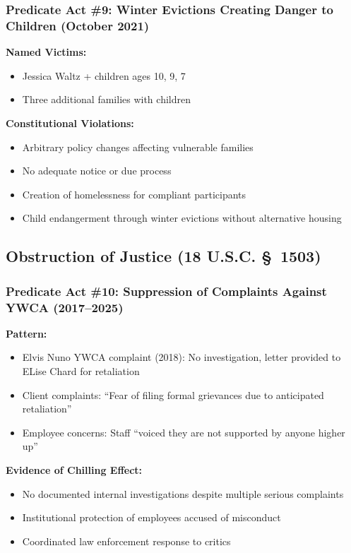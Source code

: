 \documentclass[11pt,letterpaper]{article}
\begin{document}
\subsubsection{Predicate Act \#9: Winter Evictions Creating Danger to Children (October 2021)}

\textbf{Named Victims:}
\begin{itemize}[leftmargin=*]
\item Jessica Waltz + children ages 10, 9, 7
\item Three additional families with children
\end{itemize}

\textbf{Constitutional Violations:}
\begin{itemize}[leftmargin=*]
\item Arbitrary policy changes affecting vulnerable families
\item No adequate notice or due process
\item Creation of homelessness for compliant participants
\item Child endangerment through winter evictions without alternative housing
\end{itemize}

\subsection{Obstruction of Justice (18 U.S.C. \S~1503)}

\subsubsection{Predicate Act \#10: Suppression of Complaints Against YWCA (2017--2025)}

\textbf{Pattern:}
\begin{itemize}[leftmargin=*]
\item Elvis Nuno YWCA complaint (2018): No investigation, letter provided to ELise Chard for retaliation
\item Client complaints: ``Fear of filing formal grievances due to anticipated retaliation''
\item Employee concerns: Staff ``voiced they are not supported by anyone higher up''
\end{itemize}

\textbf{Evidence of Chilling Effect:}
\begin{itemize}[leftmargin=*]
\item No documented internal investigations despite multiple serious complaints
\item Institutional protection of employees accused of misconduct
\item Coordinated law enforcement response to critics
\end{itemize}
\end{document}
